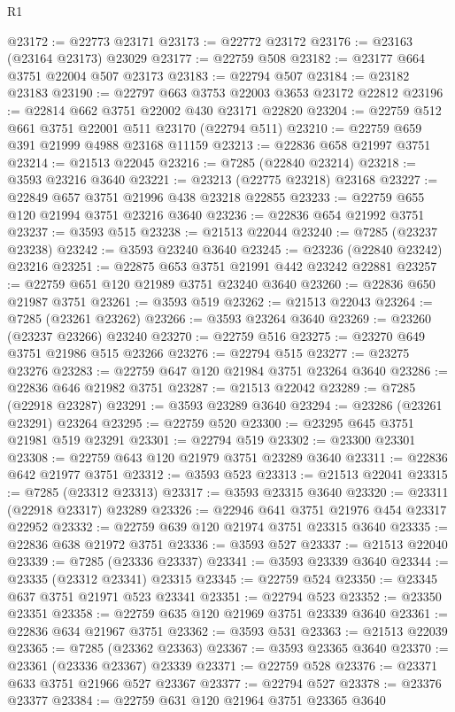 \begin{lexlean}{R1}
\begin{coremodule}
@23172 := @22773 @23171
@23173 := @22772 @23172
@23176 := @23163 (@23164 @23173) @23029
@23177 := @22759 @508
@23182 := @23177 @664 @3751 @22004 @507 @23173
@23183 := @22794 @507
@23184 := @23182 @23183
@23190 := @22797 @663 @3753 @22003 @3653 @23172 @22812
@23196 := @22814 @662 @3751 @22002 @430 @23171 @22820
@23204 := @22759 @512 @661 @3751 @22001 @511 @23170 (@22794 @511)
@23210 := @22759 @659 @391 @21999 @4988 @23168 @11159
@23213 := @22836 @658 @21997 @3751
@23214 := @21513 @22045
@23216 := @7285 (@22840 @23214)
@23218 := @3593 @23216 @3640
@23221 := @23213 (@22775 @23218) @23168
@23227 := @22849 @657 @3751 @21996 @438 @23218 @22855
@23233 := @22759 @655 @120 @21994 @3751 @23216 @3640
@23236 := @22836 @654 @21992 @3751
@23237 := @3593 @515
@23238 := @21513 @22044
@23240 := @7285 (@23237 @23238)
@23242 := @3593 @23240 @3640
@23245 := @23236 (@22840 @23242) @23216
@23251 := @22875 @653 @3751 @21991 @442 @23242 @22881
@23257 := @22759 @651 @120 @21989 @3751 @23240 @3640
@23260 := @22836 @650 @21987 @3751
@23261 := @3593 @519
@23262 := @21513 @22043
@23264 := @7285 (@23261 @23262)
@23266 := @3593 @23264 @3640
@23269 := @23260 (@23237 @23266) @23240
@23270 := @22759 @516
@23275 := @23270 @649 @3751 @21986 @515 @23266
@23276 := @22794 @515
@23277 := @23275 @23276
@23283 := @22759 @647 @120 @21984 @3751 @23264 @3640
@23286 := @22836 @646 @21982 @3751
@23287 := @21513 @22042
@23289 := @7285 (@22918 @23287)
@23291 := @3593 @23289 @3640
@23294 := @23286 (@23261 @23291) @23264
@23295 := @22759 @520
@23300 := @23295 @645 @3751 @21981 @519 @23291
@23301 := @22794 @519
@23302 := @23300 @23301
@23308 := @22759 @643 @120 @21979 @3751 @23289 @3640
@23311 := @22836 @642 @21977 @3751
@23312 := @3593 @523
@23313 := @21513 @22041
@23315 := @7285 (@23312 @23313)
@23317 := @3593 @23315 @3640
@23320 := @23311 (@22918 @23317) @23289
@23326 := @22946 @641 @3751 @21976 @454 @23317 @22952
@23332 := @22759 @639 @120 @21974 @3751 @23315 @3640
@23335 := @22836 @638 @21972 @3751
@23336 := @3593 @527
@23337 := @21513 @22040
@23339 := @7285 (@23336 @23337)
@23341 := @3593 @23339 @3640
@23344 := @23335 (@23312 @23341) @23315
@23345 := @22759 @524
@23350 := @23345 @637 @3751 @21971 @523 @23341
@23351 := @22794 @523
@23352 := @23350 @23351
@23358 := @22759 @635 @120 @21969 @3751 @23339 @3640
@23361 := @22836 @634 @21967 @3751
@23362 := @3593 @531
@23363 := @21513 @22039
@23365 := @7285 (@23362 @23363)
@23367 := @3593 @23365 @3640
@23370 := @23361 (@23336 @23367) @23339
@23371 := @22759 @528
@23376 := @23371 @633 @3751 @21966 @527 @23367
@23377 := @22794 @527
@23378 := @23376 @23377
@23384 := @22759 @631 @120 @21964 @3751 @23365 @3640

\end{coremodule}
\end{lexlean}
